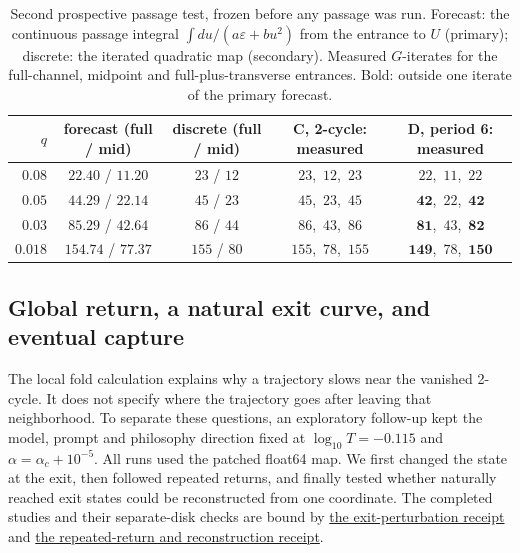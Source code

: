\documentclass[11pt,letterpaper]{article}
\newcommand{\eps}{\varepsilon}
\begin{document}
\begin{table}[H]
\centering\small
\begin{tabular}{rcccc}
\toprule
$q$ & forecast (full / mid) & discrete (full / mid) & C, 2-cycle: measured & D, period 6: measured \\
\midrule
$0.08$ & $22.40$ / $11.20$ & $23$ / $12$ & $23$,\ $12$,\ $23$ & $22$,\ $11$,\ $22$ \\
$0.05$ & $44.29$ / $22.14$ & $45$ / $23$ & $45$,\ $23$,\ $45$ & $\mathbf{42}$,\ $22$,\ $\mathbf{42}$ \\
$0.03$ & $85.29$ / $42.64$ & $86$ / $44$ & $86$,\ $43$,\ $86$ & $\mathbf{81}$,\ $43$,\ $\mathbf{82}$ \\
$0.018$ & $154.74$ / $77.37$ & $155$ / $80$ & $155$,\ $78$,\ $155$ & $\mathbf{149}$,\ $78$,\ $\mathbf{150}$ \\
\bottomrule
\end{tabular}
\caption{Second prospective passage test, frozen before any passage was run. Forecast: the continuous passage
integral $\int du/(a\eps+bu^2)$ from the entrance to $U$ (primary); discrete: the iterated quadratic map (secondary).
Measured $G$-iterates for the full-channel, midpoint and full-plus-transverse entrances. Bold: outside one iterate of
the primary forecast.}
\label{tab:prospective2}
\end{table}

\subsection{Global return, a natural exit curve, and eventual capture}
\label{sec:global-return}
The local fold calculation explains why a trajectory slows near the vanished 2-cycle. It does not specify where
the trajectory goes after leaving that neighborhood. To separate these questions, an exploratory follow-up kept
the model, prompt and philosophy direction fixed at $\log_{10}T=-0.115$ and
$\alpha=\alpha_c+10^{-5}$. All runs used the patched float64 map. We first changed the state at the exit, then
followed repeated returns, and finally tested whether naturally reached exit states could be reconstructed from one
coordinate. The completed studies and their separate-disk checks are bound by
\href{https://github.com/tdj28/neural-shrimp/blob/cf0688bc659decd2a914b61d4451dc77b0cc1eef/docs/fold-global-return.json}{the exit-perturbation receipt}
and \href{https://github.com/tdj28/neural-shrimp/blob/cf0688bc659decd2a914b61d4451dc77b0cc1eef/docs/fold-return-mechanism.json}{the repeated-return and reconstruction receipt}.
\end{document}
